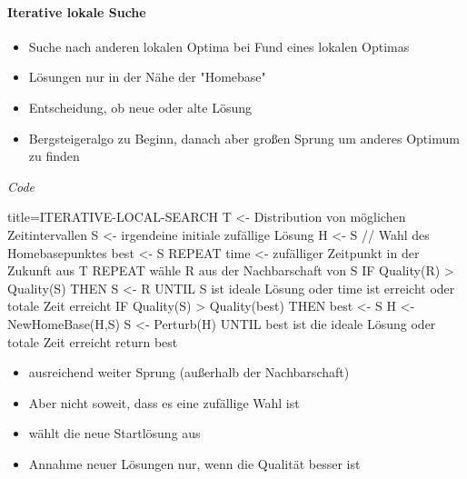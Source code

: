 \documentclass[
    ngerman,
    color=3b,
    load_common, %
    summary,
    boxarc,
]{rubos-tuda-template}
\begin{document}
\clearpage
\paragraph{Iterative lokale Suche}\mbox{}
\begin{idea}\mbox{}
    \begin{itemize}
        \item Suche nach anderen lokalen Optima bei Fund eines lokalen Optimas
        \item Lösungen nur in der Nähe der \string"Homebase\string"
        \item Entscheidung, ob neue oder alte Lösung
        \item Bergsteigeralgo zu Beginn, danach aber gro\ss{}en Sprung um anderes Optimum zu finden
    \end{itemize}
\end{idea}

\textit{Code}
\begin{codeBlock}[autogobble,fontsize=\small]{title={ITERATIVE-LOCAL-SEARCH}}
    T <- Distribution von möglichen Zeitintervallen
    S <- irgendeine initiale zufällige Lösung
    H <- S      // Wahl des Homebasepunktes
    best <- S
    REPEAT
        time <- zufälliger Zeitpunkt in der Zukunft aus T
        REPEAT
            wähle R aus der Nachbarschaft von S
            IF Quality(R) > Quality(S) THEN
                S <- R
        UNTIL S ist ideale Lösung oder time ist erreicht oder totale Zeit erreicht
        IF Quality(S) > Quality(best) THEN
            best <- S
        H <- NewHomeBase(H,S)
        S <- Perturb(H)
    UNTIL best ist die ideale Lösung oder totale Zeit erreicht
    return best
\end{codeBlock}
\begin{description}[leftmargin=3cm,itemsep=1em]
    \item[Perturb] \begin{itemize}
              \item ausreichend weiter Sprung (au\ss{}erhalb der Nachbarschaft)
              \item Aber nicht soweit, dass es eine zufällige Wahl ist
          \end{itemize}
    \item[NewHomeBase] \begin{itemize}
              \item wählt die neue Startlösung aus
              \item Annahme neuer Lösungen nur, wenn die Qualität besser ist
          \end{itemize}
\end{description}
\end{document}

